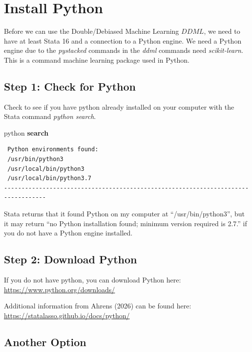 \documentclass[
]{book}
\newenvironment{Shaded}{\begin{snugshade}}{\end{snugshade}}
\newcommand{\KeywordTok}[1]{\textcolor[rgb]{0.13,0.29,0.53}{\textbf{#1}}}
\newcommand{\NormalTok}[1]{#1}
\begin{document}
\section{Install Python}\label{install-python}

Before we can use the Double/Debiased Machine Learning \(DDML\), we need to have at least Stata 16 and a connection to a Python engine. We need a Python engine due to the \emph{pystacked} commands in the \emph{ddml} commands need \emph{scikit-learn}. This is a command machine learning package used in Python.

\subsection{Step 1: Check for Python}\label{step-1-check-for-python}

Check to see if you have python already installed on your computer with the Stata command \emph{python search}.

\begin{Shaded}
\begin{Highlighting}[]
\NormalTok{python }\KeywordTok{search}
\end{Highlighting}
\end{Shaded}

\begin{verbatim}
 Python environments found:  
 /usr/bin/python3
 /usr/local/bin/python3
 /usr/local/bin/python3.7
----------------------------------------------------------------------------------
\end{verbatim}

Stata returns that it found Python on my computer at ``/usr/bin/python3'', but it may return ``no Python installation found; minimum version required is 2.7.'' if you do not have a Python engine installed.

\subsection{Step 2: Download Python}\label{step-2-download-python}

If you do not have python, you can download Python here: \url{https://www.python.org/downloads/}

Additional information from Ahrens (2026) can be found here: \url{https://statalasso.github.io/docs/python/}

\subsection{Another Option}\label{another-option}
\end{document}
